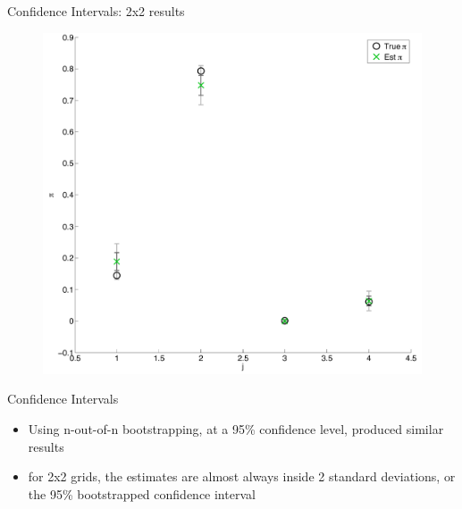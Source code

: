 \documentclass{beamer}
\begin{document}
\begin{frame}{Confidence Intervals: 2x2 results}
	
	\begin{figure}
			\begin{center}
				\includegraphics[scale=0.3]{2x2eb.pdf}
			\end{center}
	\end{figure}
	
\end{frame}
\begin{frame}[shrink]{Confidence Intervals}
	
	\begin{itemize}
		\item Using n-out-of-n bootstrapping, at a 95\% confidence level, produced similar results
		\item for 2x2 grids, the estimates are almost always inside 2 standard deviations, or the 95\% bootstrapped confidence interval
	\end{itemize}
	
\end{frame}
\end{document}
